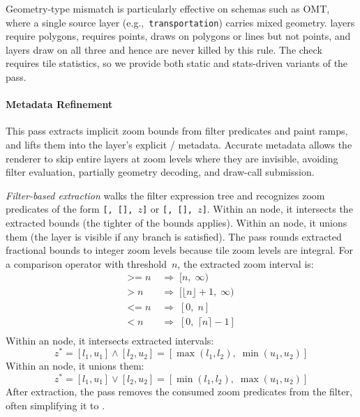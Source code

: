 Geometry-type mismatch is particularly effective on schemas such as \ac{OMT}, where a single source layer (e.g.,\ \texttt{transportation}) carries mixed geometry.  layers require polygons,  requires points,  draws on polygons or lines but not points, and  layers draw on all three and hence are never killed by this rule.
The check requires tile statistics, so we provide both static and stats-driven variants of the pass.

\paragraph{Metadata Refinement}
This pass extracts implicit zoom bounds from filter predicates and paint ramps, and lifts them into the layer's explicit /  metadata.
Accurate metadata allows the renderer to skip entire layers at zoom levels where they are invisible, avoiding filter evaluation, partially geometry decoding, and draw-call submission.

\emph{Filter-based extraction} walks the filter expression tree and recognizes zoom predicates of the form \texttt{[,~[],~$z$]} or \texttt{[,~[],~$z$]}.
Within an  node, it intersects the extracted bounds (the tighter of the bounds applies).
Within an  node, it unions them (the layer is visible if any branch is satisfied).
The pass rounds extracted fractional bounds to integer zoom levels because tile zoom levels are integral.
For a comparison operator with threshold~$n$, the extracted zoom interval is:
\begin{equation}\label{eq:zoom_bounds}
    \begin{aligned}
        \texttt{>=}\; n &\;\Rightarrow\; [n,\;\infty) \\
        \texttt{>}\; n  &\;\Rightarrow\; [\lfloor n \rfloor + 1,\;\infty) \\
        \texttt{<=}\; n &\;\Rightarrow\; [0,\; n]\\
        \texttt{<}\; n  &\;\Rightarrow\; [0,\; \lceil n \rceil - 1] \\
    \end{aligned}
\end{equation}
Within an  node, it intersects extracted intervals:
\[
z^{*} = [l_1, u_1] \land [l_2, u_2] = [\max(l_1, l_2),\; \min(u_1, u_2)]
\]
Within an  node, it unions them:
\[
z^{*} = [l_1, u_1] \lor [l_2, u_2] = [\min(l_1, l_2),\; \max(u_1, u_2)]
\]
After extraction, the pass removes the consumed zoom predicates from the filter, often simplifying it to .

